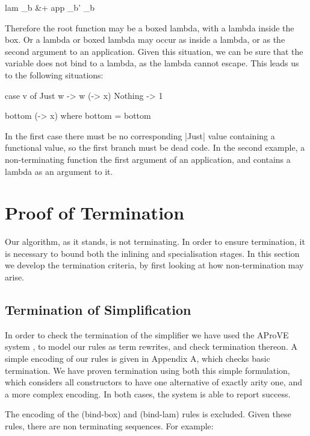 \documentclass[preprint]{sigplanconf}
\begin{document}
\begin{code}
lam _b &+ app _b' _b
\end{code}

Therefore the root function may be a boxed lambda, with a lambda inside the box. Or a lambda or boxed lambda may occur as inside a lambda, or as the second argument to an application. Given this situation, we can be sure that the variable does not bind to a lambda, as the lambda cannot escape. This leads us to the following situations:

\begin{code}
case v of
    Just w -> w (\x -> x)
    Nothing -> 1

bottom (\x -> x)
    where bottom = bottom
\end{code}

In the first case there must be no corresponding |Just| value containing a functional value, so the first branch must be dead code. In the second example, a non-terminating function the first argument of an application, and contains a lambda as an argument to it.


\section{Proof of Termination}
\label{sec:firstify_terminate}

Our algorithm, as it stands, is not terminating. In order to ensure termination, it is necessary to bound both the inlining and specialisation stages. In this section we develop the termination criteria, by first looking at how non-termination may arise.

\subsection{Termination of Simplification}

In order to check the termination of the simplifier we have used the AProVE system \cite{aprove}, to model our rules as term rewrites, and check termination thereon. A simple encoding of our rules is given in Appendix A, which checks basic termination. We have proven termination using both this simple formulation, which considers all constructors to have one alternative of exactly arity one, and a more complex encoding. In both cases, the system is able to report success.

The encoding of the (bind-box) and (bind-lam) rules is excluded. Given these rules, there are non terminating sequences. For example:
\end{document}
